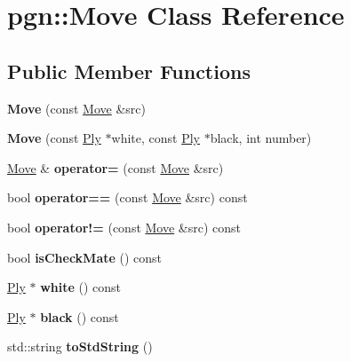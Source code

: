 \hypertarget{classpgn_1_1Move}{
\section{pgn::Move Class Reference}
\label{classpgn_1_1Move}
}
\subsection*{Public Member Functions}
\begin{DoxyCompactItemize}
\item 
\hypertarget{classpgn_1_1Move_a28247b92783975d25036b9d5194114b4}{
{\bfseries Move} (const \hyperlink{classpgn_1_1Move}{Move} \&src)}
\label{classpgn_1_1Move_a28247b92783975d25036b9d5194114b4}

\item 
\hypertarget{classpgn_1_1Move_a25045059decc1f06eb0088f52c277ea3}{
{\bfseries Move} (const \hyperlink{classpgn_1_1Ply}{Ply} $\ast$white, const \hyperlink{classpgn_1_1Ply}{Ply} $\ast$black, int number)}
\label{classpgn_1_1Move_a25045059decc1f06eb0088f52c277ea3}

\item 
\hypertarget{classpgn_1_1Move_a13eaa8cab0874d6f5c30017c179ca608}{
\hyperlink{classpgn_1_1Move}{Move} \& {\bfseries operator=} (const \hyperlink{classpgn_1_1Move}{Move} \&src)}
\label{classpgn_1_1Move_a13eaa8cab0874d6f5c30017c179ca608}

\item 
\hypertarget{classpgn_1_1Move_ab29d7ad0a246c58f53840c30163ff932}{
bool {\bfseries operator==} (const \hyperlink{classpgn_1_1Move}{Move} \&src) const }
\label{classpgn_1_1Move_ab29d7ad0a246c58f53840c30163ff932}

\item 
\hypertarget{classpgn_1_1Move_a59795e9c42731f979271d86546c254aa}{
bool {\bfseries operator!=} (const \hyperlink{classpgn_1_1Move}{Move} \&src) const }
\label{classpgn_1_1Move_a59795e9c42731f979271d86546c254aa}

\item 
\hypertarget{classpgn_1_1Move_ad15aa895b133bf43304b147bc3db9e5d}{
bool {\bfseries isCheckMate} () const }
\label{classpgn_1_1Move_ad15aa895b133bf43304b147bc3db9e5d}

\item 
\hypertarget{classpgn_1_1Move_a0321dd73f271684cf7040bb61c1934e3}{
\hyperlink{classpgn_1_1Ply}{Ply} $\ast$ {\bfseries white} () const }
\label{classpgn_1_1Move_a0321dd73f271684cf7040bb61c1934e3}

\item 
\hypertarget{classpgn_1_1Move_a112464932b1bf070ef1c465fadb9c4b1}{
\hyperlink{classpgn_1_1Ply}{Ply} $\ast$ {\bfseries black} () const }
\label{classpgn_1_1Move_a112464932b1bf070ef1c465fadb9c4b1}

\item 
\hypertarget{classpgn_1_1Move_a0f09e103caca4e9484779d67e4ff2e54}{
std::string {\bfseries toStdString} ()}
\label{classpgn_1_1Move_a0f09e103caca4e9484779d67e4ff2e54}

\end{DoxyCompactItemize}
